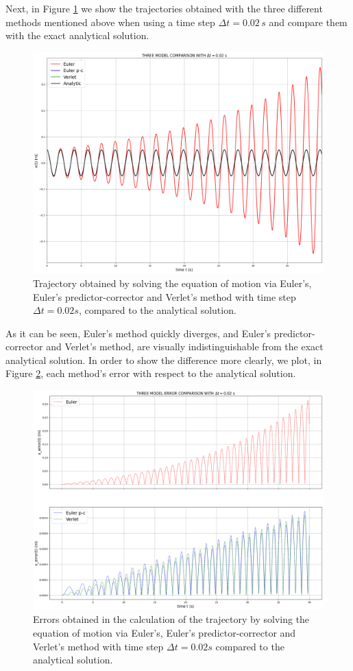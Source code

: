 \documentclass{article}
\begin{document}
Next, in Figure \ref{fig:Three_methods} we show the trajectories obtained with the three different methods mentioned above when using a time step $\Delta t=0.02 \,s$ and compare them with the exact analytical solution.
\begin{figure}[h!]
 \centering
  \includegraphics[width=0.7\linewidth]{Three_methods_eq_motion.png}
  \caption{Trajectory obtained by solving the equation of motion via Euler's, Euler's predictor-corrector and Verlet's method with time step $\Delta t=0.02 s$, compared to the analytical solution.}
  \label{fig:Three_methods}
\end{figure}
As it can be seen, Euler's method quickly diverges, and Euler's predictor-corrector and Verlet's method, are visually indistinguishable from the exact analytical solution. In order to show the difference more clearly, we plot, in Figure \ref{fig:Error_three_methods}, each method's error with respect to the analytical solution.\\
\begin{figure}[h!]
 \centering
  \includegraphics[width=0.7\linewidth]{Error_eq_motion.png}
  \caption{Errors obtained in the calculation of the trajectory by solving the equation of motion via Euler's, Euler's predictor-corrector and Verlet's method with time step $\Delta t=0.02 s$ compared to the analytical solution.}
  \label{fig:Error_three_methods}
\end{figure}
\end{document}
